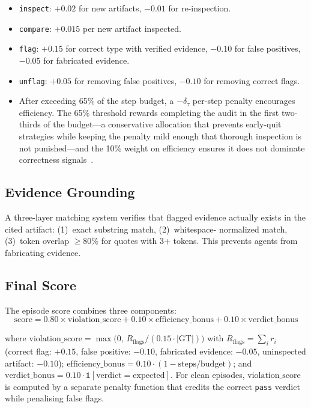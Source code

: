 \documentclass{article}
\begin{document}
\begin{itemize}[nosep]
  \item \texttt{inspect}: $+0.02$ for new artifacts, $-0.01$ for re-inspection.
  \item \texttt{compare}: $+0.015$ per new artifact inspected.
  \item \texttt{flag}: $+0.15$ for correct type with verified evidence,
        $-0.10$ for false positives, $-0.05$ for fabricated evidence.
  \item \texttt{unflag}: $+0.05$ for removing false positives,
        $-0.10$ for removing correct flags.
  \item After exceeding 65\% of the step budget, a $-\delta_\tau$ per-step penalty
        encourages efficiency.
        The 65\% threshold rewards completing the audit in the first two-thirds of the
        budget---a conservative allocation that prevents early-quit strategies while
        keeping the penalty mild enough that thorough inspection is not punished---and
        the 10\% weight on efficiency ensures it does not dominate correctness
        signals~\citep{ng1999policy}.
\end{itemize}

\subsection{Evidence Grounding}

A three-layer matching system verifies that flagged evidence actually
exists in the cited artifact: (1)~exact substring match, (2)~whitespace-
normalized match, (3)~token overlap $\geq 80\%$ for quotes with 3+ tokens.
This prevents agents from fabricating evidence.

\subsection{Final Score}

The episode score combines three components:
\begin{equation}
  \text{score} = 0.80 \times \text{violation\_score}
               + 0.10 \times \text{efficiency\_bonus}
               + 0.10 \times \text{verdict\_bonus}
\end{equation}

where $\text{violation\_score} = \max\!\bigl(0,\, R_\text{flags} / (0.15 \cdot |\text{GT}|)\bigr)$
with $R_\text{flags} = \sum_i r_i$ (correct flag: $+0.15$, false positive: $-0.10$,
fabricated evidence: $-0.05$, uninspected artifact: $-0.10$);
$\text{efficiency\_bonus} = 0.10 \cdot (1 - \text{steps} / \text{budget})$; and
$\text{verdict\_bonus} = 0.10 \cdot \mathbb{1}[\text{verdict} = \text{expected}]$.
For clean episodes, $\text{violation\_score}$ is computed by a separate penalty
function that credits the correct \texttt{pass} verdict while penalising false flags.
\end{document}
